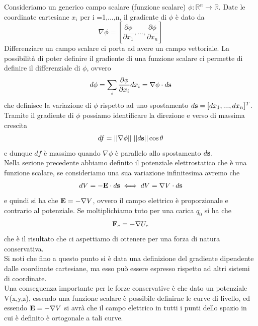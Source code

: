 Consideriamo un generico campo scalare (funzione scalare) $\phi : \mathbb{R}^n \to \mathbb{R} $. Date le coordinate cartesiane $x_i $ per i =1,...,n, il gradiente di $\phi$ \`e dato da 
\begin{equation*}
	\nabla \phi = \left [ \frac{\partial \phi}{\partial x_1},...,\frac{\partial \phi}{\partial x_n} \right ] 
\end{equation*}
Differenziare un campo scalare ci porta ad avere un campo vettoriale. La possibilit\`a di poter definire il gradiente di una funzione scalare ci permette di definire il differenziale di $\phi$, ovvero
\begin{equation*}
	d\phi = \sum_{i} \frac{\partial \phi}{\partial x_i}dx_i = \nabla \phi \cdot d\bold{s}
\end{equation*}
che definisce la variazione di $\phi$ rispetto ad uno spostamento $d\bold{s} = [dx_1,...,dx_n]^T$. Tramite il gradiente di $\phi$ possiamo identificare la direzione e verso di massima crescita
\begin{equation*}
	df = ||\nabla \phi||\;||d\bold{s}|| \cos \theta 
\end{equation*}
e dunque $df$ \`e massimo quando $\nabla \phi$ \`e parallelo allo spostamento $d\bold{s}$.
\\
\noindent Nella sezione precedente abbiamo definito il potenziale elettrostatico che \`e una funzione scalare, se consideriamo una sua variazione infinitesima avremo che
\begin{equation*}
	dV = - \bold{E} \cdot d\bold{s} \iff dV = \nabla V \cdot d\bold{s} 
\end{equation*}
e quindi si ha che $\bold{E} = - \nabla V$, ovvero il campo elettrico \`e proporzionale e contrario al potenziale. Se moltiplichiamo tuto per una carica $q_0$ si ha che 
\begin{equation*}
	\bold{F}_e = - \nabla U_e
\end{equation*}
che \`e il risultato che ci aspettiamo di ottenere per una forza di natura conservativa.
\\
\noindent Si noti che fino a questo punto si \`e data una definizione del gradiente dipendente dalle coordinate cartesiane, ma esso pu\`o essere espresso rispetto ad altri sistemi di coordinate.
\\

\noindent Una conseguenza importante per le forze conservative \`e che dato un potenziale V(x,y,z), essendo una funzione scalare \`e possibile definirne le curve di livello, ed essendo $\bold{E} = - \nabla V$ si avr\`a che il campo elettrico in tutti i punti dello spazio in cui \`e definito \`e ortogonale a tali curve.
